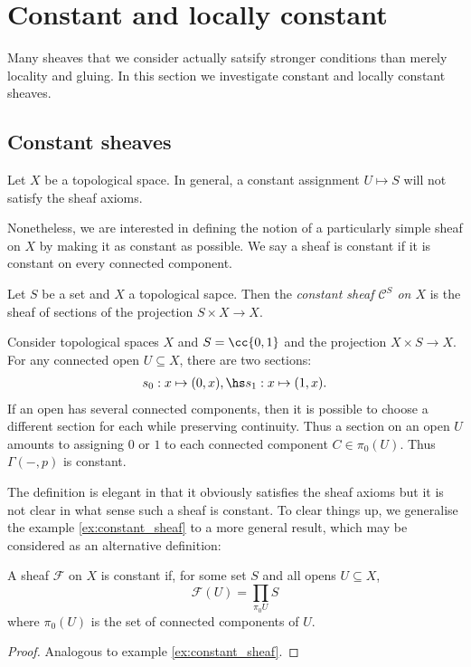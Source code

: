\documentclass{article}
\begin{document}
\section{Constant and locally constant}\label{sec:locally_constant_sheaves}

Many sheaves that we consider actually satsify stronger conditions
than merely locality and gluing. In this section we investigate constant
and locally constant sheaves.

\subsection{Constant sheaves}

Let $X$ be a topological space. In general, a constant assignment
$U\mapsto S$ will not satisfy the sheaf axioms.

Nonetheless,
we are interested in defining the notion of a particularly simple
sheaf on $X$ by making it as constant as possible. We say a sheaf
is constant if it is constant on every connected component.

\begin{definition}
  Let $S$ be a set and $X$ a topological sapce. Then
  the \emph{constant sheaf $\mathscr C^S$ on $X$} is the sheaf of sections
  of the projection $S\times X\to X$.
\end{definition}

\begin{example}\label{ex:constant_sheaf}
  Consider topological spaces $X$ and $S=\cc{0,1}$ and the
  projection $X\times S\to X$. For any
  connected open $U\subseteq X$, there are two sections:
  \begin{align*}
    s_0:x \mapsto(0,x), \hs s_1:x\mapsto(1,x).
  \end{align*}
  If an open has several connected components, then it is possible to
  choose a different section for each while preserving continuity.
  Thus a section on an open $U$ amounts to assigning $0$ or $1$ to each
  connected component $C\in\pi_0(U)$. Thus $\Gamma(-,p)$ is constant.
\end{example}

The definition is elegant in that it obviously satisfies the sheaf
axioms but it is not clear in what sense such a sheaf is constant.
To clear things up, we generalise the example \ref{ex:constant_sheaf}
to a more general result, which may be considered as an alternative
definition:

\begin{proposition}
  A sheaf $\mathscr F$ on $X$ is constant if, for some set $S$ and all opens $U\subseteq X$,
  \begin{equation}
    \mathscr F(U) = \prod_{\pi_0U}S
  \end{equation}
  where $\pi_0(U)$ is the set of connected components of $U$.
  \begin{proof}
    Analogous to example \ref{ex:constant_sheaf}.
  \end{proof}
\end{proposition}
\end{document}
